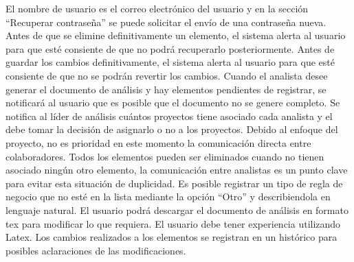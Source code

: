 \clearpage
\begin{riesgos}
		{El nombre de usuario es el correo electrónico del usuario y en la sección ``Recuperar contraseña'' se puede solicitar el envío de una contraseña nueva.}
		{Antes de que se elimine definitivamente un elemento, el sistema alerta al usuario para que esté consiente de que no podrá recuperarlo posteriormente.}
		{Antes de guardar los cambios definitivamente, el sistema alerta al usuario para que esté consiente de que no se podrán revertir los cambios.}
		{Cuando el analista desee generar el documento de análisis y hay elementos pendientes de registrar, se notificará al usuario que es posible que el documento 
		no se genere completo.}
		{Se notifica al líder de análisis cuántos proyectos tiene asociado cada analista y el debe tomar la decisión de asignarlo o no a los proyectos.}
		{Debido al enfoque del proyecto, no es prioridad en este momento la comunicación directa entre colaboradores.}
 		{Todos los elementos pueden ser eliminados cuando no tienen asociado ningún otro elemento, la comunicación entre analistas es un punto clave para evitar esta situación de duplicidad.}
 		{Es posible registrar un tipo de regla de negocio que no esté en la lista mediante la opción ``Otro'' y describiendola en lenguaje natural.}
 		{El usuario podrá descargar el documento de análisis en formato tex para modificar lo que requiera. El usuario debe tener experiencia utilizando Latex.}
		{Los cambios realizados a los elementos se registran en un histórico para posibles aclaraciones de las modificaciones.}
\end{riesgos}



